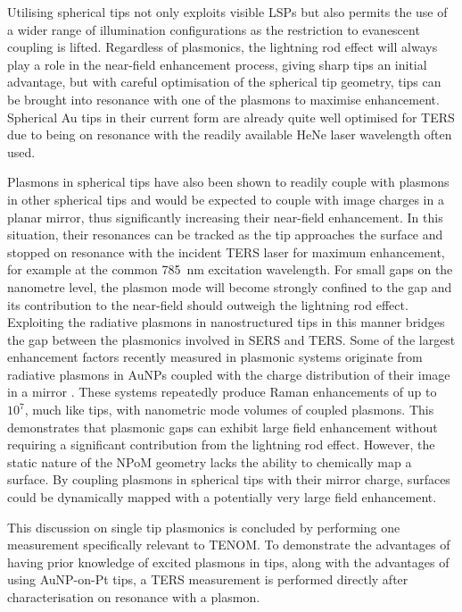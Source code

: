 \documentclass{article}
\begin{document}
Utilising spherical tips not only exploits visible LSPs but also permits the use of a wider range of illumination configurations as the restriction to evanescent coupling is lifted. Regardless of plasmonics, the lightning rod effect will always play a role in the near-field enhancement process, giving sharp tips an initial advantage, but with careful optimisation of the spherical tip geometry, tips can be brought into resonance with one of the plasmons to maximise enhancement. Spherical Au tips in their current form are already quite well optimised for TERS due to being on resonance with the readily available HeNe laser wavelength often used.

Plasmons in spherical tips have also been shown to readily couple with plasmons in other spherical tips \cite{savage2012} and would be expected to couple with image charges in a planar mirror, thus significantly increasing their near-field enhancement. In this situation, their resonances can be tracked as the tip approaches the surface and stopped on resonance with the incident TERS laser for maximum enhancement, for example at the common \SI{785}{nm} excitation wavelength. For small gaps on the nanometre level, the plasmon mode will become strongly confined to the gap and its contribution to the near-field should outweigh the lightning rod effect.
Exploiting the radiative plasmons in nanostructured tips in this manner bridges the gap between the plasmonics involved in SERS and TERS. Some of the largest enhancement factors recently measured in plasmonic systems originate from radiative plasmons in AuNPs coupled with the charge distribution of their image in a mirror \cite{mertens2013, taylor2014}. These systems repeatedly produce Raman enhancements of up to $10^7$, much like tips, with nanometric mode volumes of coupled plasmons. This demonstrates that plasmonic gaps can exhibit large field enhancement without requiring a significant contribution from the lightning rod effect. However, the static nature of the NPoM geometry lacks the ability to chemically map a surface. By coupling plasmons in spherical tips with their mirror charge, surfaces could be dynamically mapped with a potentially very large field enhancement.

This discussion on single tip plasmonics is concluded by performing one measurement specifically relevant to TENOM. To demonstrate the advantages of having prior knowledge of excited plasmons in tips, along with the advantages of using AuNP-on-Pt tips, a TERS measurement is performed directly after characterisation on resonance with a plasmon.
\end{document}
